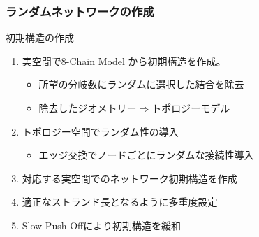 \documentclass[12pt, dvipdfmx]{beamer}
\begin{document}
\begin{frame}
	\frametitle{ランダムネットワークの作成}
	\vspace{-3mm}
	\begin{block}{初期構造の作成}
		\begin{enumerate}
			\item \alert{実空間}で8-Chain Model から初期構造を作成。
				\begin{itemize}
					\normalsize
					\item 所望の分岐数に\alert{ランダム}に選択した\alert{結合を除去}
					\item 除去したジオメトリー$\Rightarrow$\alert{トポロジーモデル}
				\end{itemize}
			\item トポロジー空間でランダム性の導入
				\begin{itemize}
					\normalsize
					\item \alert{エッジ交換}でノードごとにランダムな接続性導入
				\end{itemize}	
			\item 対応する\alert{実空間でのネットワーク初期構造}を作成
			\item \alert{適正なストランド長}となるように多重度設定
			\item \alert{Slow Push Offにより初期構造を緩和}
		\end{enumerate}


\end{block}
\end{frame}
\end{document}
